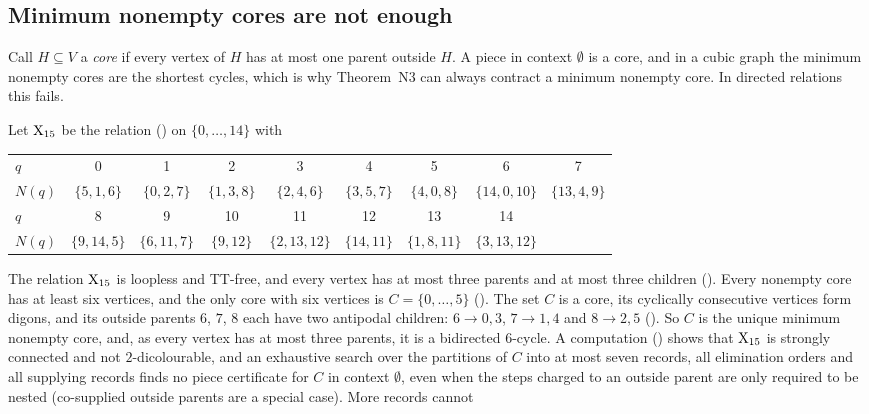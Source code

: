 \subsection{Minimum nonempty cores are not enough}\label{sec:cores}

Call $H\subseteq V$ a \emph{core} if every vertex of $H$ has at most one parent outside $H$. A piece in context
$\emptyset$ is a core, and in a cubic graph the minimum nonempty cores are the shortest cycles, which is why Theorem~N3
can always contract a minimum nonempty core. In directed relations this fails.

\begin{remark}\label{rem:X15}
Let $\mathrm{X}_{15}$ be the relation () on $\{0,\dots,14\}$ with
\begin{center}
\small
\begin{tabular}{@{}l*{8}{c}@{}}
\toprule
$q$ & 0 & 1 & 2 & 3 & 4 & 5 & 6 & 7\\
$N(q)$ & $\{5,1,6\}$ & $\{0,2,7\}$ & $\{1,3,8\}$ & $\{2,4,6\}$ & $\{3,5,7\}$ & $\{4,0,8\}$ & $\{14,0,10\}$ & $\{13,4,9\}$\\
\midrule
$q$ & 8 & 9 & 10 & 11 & 12 & 13 & 14 & \\
$N(q)$ & $\{9,14,5\}$ & $\{6,11,7\}$ & $\{9,12\}$ & $\{2,13,12\}$ & $\{14,11\}$ & $\{1,8,11\}$ & $\{3,13,12\}$ & \\
\bottomrule
\end{tabular}
\end{center}
The relation $\mathrm{X}_{15}$ is loopless and TT-free, and every vertex has at most three parents and at most three children
(). Every nonempty core has at least six vertices, and the only core with six vertices is
$C=\{0,\dots,5\}$ (). The set $C$ is a core, its cyclically consecutive vertices form digons, and its
outside parents $6$, $7$, $8$ each have two antipodal children: $6\to0,3$, $7\to1,4$ and $8\to2,5$ ().
So $C$ is the unique minimum nonempty core, and, as every vertex has at most three parents, it is a bidirected
$6$-cycle. A computation () shows that $\mathrm{X}_{15}$ is strongly connected and not
$2$-dicolourable, and an exhaustive search over the partitions of $C$ into at most seven records, all elimination orders
and all supplying records finds no piece certificate for $C$ in context $\emptyset$, even when the steps charged to an
outside parent are only required to be nested (co-supplied outside parents are a special case). More records cannot

\end{remark}
